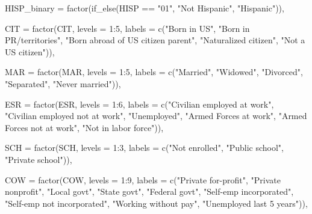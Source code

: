 \documentclass[
  letterpaper,
  DIV=11,
  numbers=noendperiod]{scrartcl}
\newenvironment{Shaded}{\begin{snugshade}}{\end{snugshade}}
\newcommand{\AttributeTok}[1]{\textcolor[rgb]{0.40,0.45,0.13}{#1}}
\newcommand{\DecValTok}[1]{\textcolor[rgb]{0.68,0.00,0.00}{#1}}
\newcommand{\FunctionTok}[1]{\textcolor[rgb]{0.28,0.35,0.67}{#1}}
\newcommand{\NormalTok}[1]{\textcolor[rgb]{0.00,0.23,0.31}{#1}}
\newcommand{\SpecialCharTok}[1]{\textcolor[rgb]{0.37,0.37,0.37}{#1}}
\newcommand{\StringTok}[1]{\textcolor[rgb]{0.13,0.47,0.30}{#1}}
\begin{document}
\begin{Shaded}
\begin{Highlighting}[]
    \AttributeTok{HISP\_binary =} \FunctionTok{factor}\NormalTok{(}\FunctionTok{if\_else}\NormalTok{(HISP }\SpecialCharTok{==} \StringTok{"01"}\NormalTok{, }\StringTok{"Not Hispanic"}\NormalTok{, }\StringTok{"Hispanic"}\NormalTok{)),}

    \AttributeTok{CIT =} \FunctionTok{factor}\NormalTok{(CIT, }\AttributeTok{levels =} \DecValTok{1}\SpecialCharTok{:}\DecValTok{5}\NormalTok{,}
                 \AttributeTok{labels =} \FunctionTok{c}\NormalTok{(}\StringTok{"Born in US"}\NormalTok{, }\StringTok{"Born in PR/territories"}\NormalTok{,}
                            \StringTok{"Born abroad of US citizen parent"}\NormalTok{,}
                            \StringTok{"Naturalized citizen"}\NormalTok{, }\StringTok{"Not a US citizen"}\NormalTok{)),}

    \AttributeTok{MAR =} \FunctionTok{factor}\NormalTok{(MAR, }\AttributeTok{levels =} \DecValTok{1}\SpecialCharTok{:}\DecValTok{5}\NormalTok{,}
                 \AttributeTok{labels =} \FunctionTok{c}\NormalTok{(}\StringTok{"Married"}\NormalTok{, }\StringTok{"Widowed"}\NormalTok{, }\StringTok{"Divorced"}\NormalTok{,}
                            \StringTok{"Separated"}\NormalTok{, }\StringTok{"Never married"}\NormalTok{)),}

    \AttributeTok{ESR =} \FunctionTok{factor}\NormalTok{(ESR, }\AttributeTok{levels =} \DecValTok{1}\SpecialCharTok{:}\DecValTok{6}\NormalTok{,}
                 \AttributeTok{labels =} \FunctionTok{c}\NormalTok{(}\StringTok{"Civilian employed at work"}\NormalTok{,}
                            \StringTok{"Civilian employed not at work"}\NormalTok{,}
                            \StringTok{"Unemployed"}\NormalTok{,}
                            \StringTok{"Armed Forces at work"}\NormalTok{,}
                            \StringTok{"Armed Forces not at work"}\NormalTok{,}
                            \StringTok{"Not in labor force"}\NormalTok{)),}

    \AttributeTok{SCH =} \FunctionTok{factor}\NormalTok{(SCH, }\AttributeTok{levels =} \DecValTok{1}\SpecialCharTok{:}\DecValTok{3}\NormalTok{,}
                 \AttributeTok{labels =} \FunctionTok{c}\NormalTok{(}\StringTok{"Not enrolled"}\NormalTok{, }\StringTok{"Public school"}\NormalTok{, }\StringTok{"Private school"}\NormalTok{)),}

    \AttributeTok{COW =} \FunctionTok{factor}\NormalTok{(COW, }\AttributeTok{levels =} \DecValTok{1}\SpecialCharTok{:}\DecValTok{9}\NormalTok{,}
                 \AttributeTok{labels =} \FunctionTok{c}\NormalTok{(}\StringTok{"Private for{-}profit"}\NormalTok{, }\StringTok{"Private nonprofit"}\NormalTok{,}
                            \StringTok{"Local govt"}\NormalTok{, }\StringTok{"State govt"}\NormalTok{, }\StringTok{"Federal govt"}\NormalTok{,}
                            \StringTok{"Self{-}emp incorporated"}\NormalTok{, }\StringTok{"Self{-}emp not incorporated"}\NormalTok{,}
                            \StringTok{"Working without pay"}\NormalTok{, }\StringTok{"Unemployed last 5 years"}\NormalTok{)),}


\end{Highlighting}
\end{Shaded}
\end{document}
